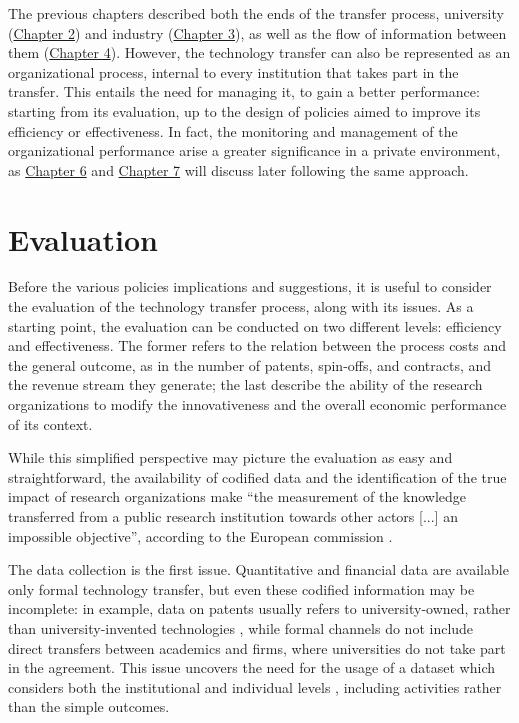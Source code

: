 

\label{Chapter5} %

The previous chapters described both the ends of the transfer process, university (\hyperref[Chapter2]{Chapter 2}) and industry (\hyperref[Chapter3]{Chapter 3}), as well as the flow of information between them (\hyperref[Chapter4]{Chapter 4}). However, the technology transfer can also be represented as an organizational process, internal to every institution that takes part in the transfer. This entails the need for managing it, to gain a better performance: starting from its evaluation, up to the design of policies aimed to improve its efficiency or effectiveness. In fact, the monitoring and management of the organizational performance arise a greater significance in a private environment, as \hyperref[Chapter6]{Chapter 6} and \hyperref[Chapter7]{Chapter 7} will discuss later following the same approach.

\section{Evaluation}

Before the various policies implications and suggestions, it is useful to consider the evaluation of the technology transfer process, along with its issues. As a starting point, the evaluation can be conducted on two different levels: efficiency and effectiveness. The former refers to the relation between the process costs and the general outcome, as in the number of patents, spin-offs, and contracts, and the revenue stream they generate; the last describe the ability of the research organizations to modify the innovativeness and the overall economic performance of its context. 

While this simplified perspective may picture the evaluation as easy and straightforward, the availability of codified data and the identification of the true impact of research organizations make \enquote{the measurement of the knowledge transferred from a public research institution towards other actors [...] an impossible objective}, according to the European commission \citep{Balderi2010}. 

The data collection is the first issue. Quantitative and financial data are available only formal technology transfer, but even these codified information may be incomplete: in example, data on patents usually refers to university-owned, rather than university-invented technologies \citep{Geuna2009}, while formal channels do not include direct transfers between academics and firms, where universities do not take part in the agreement. This issue uncovers the need for the usage of a dataset which considers both the institutional and individual levels \citep{Wong2010}, including activities rather than the simple outcomes. 


